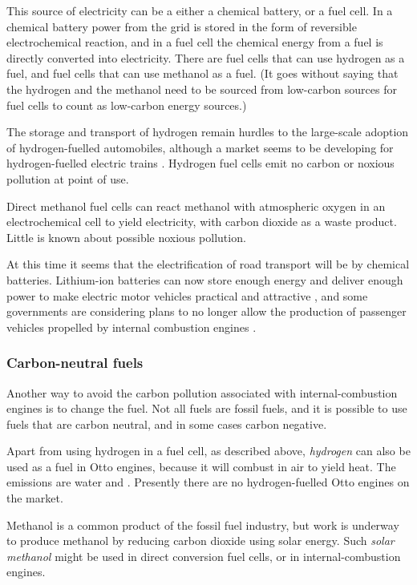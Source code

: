 This source of electricity can be a either a chemical battery, or a fuel cell.
In a chemical battery power from the grid is stored in the form of reversible
electrochemical reaction, and in a fuel cell the chemical energy from a fuel is
directly converted into electricity. There are fuel cells that can use hydrogen
as a fuel, and fuel cells that can use methanol as a fuel. (It goes without
saying that the hydrogen and the methanol need to be sourced from low-carbon
sources for fuel cells to count as low-carbon energy sources.)

The storage and transport of hydrogen remain hurdles to the large-scale adoption
of hydrogen-fuelled automobiles, although a market seems to be developing for
hydrogen-fuelled electric trains \autocite{theguardian_2018}. Hydrogen fuel cells
emit no carbon or noxious pollution at point of use.

Direct methanol fuel cells can react methanol with atmospheric oxygen in an
electrochemical cell to yield electricity, with carbon dioxide
as a waste product. Little is known about possible noxious pollution.

At this time it seems that the electrification of road transport will be by
chemical batteries. Lithium-ion batteries can now store enough energy and
deliver enough power to make electric motor vehicles practical and
attractive \autocite{Hayes2011}, and some governments are considering plans to no
longer allow the production of passenger vehicles propelled by internal
combustion engines \autocite{Burke-Kennedy2018} \autocite{Reuters2018}
\autocite{Gabbatiss2018}.

\subsubsection{Carbon-neutral fuels} 

Another way to avoid the carbon pollution associated with internal-combustion
engines is to change the fuel. Not all fuels are fossil fuels, and it is
possible to use fuels that are carbon neutral, and in some cases carbon
negative.

Apart from using hydrogen in a fuel cell, as described above, \textit{hydrogen}
can also be used as a fuel in Otto engines, because it will combust in air to
yield heat. The emissions are water and \nox. Presently there are no
hydrogen-fuelled Otto engines on the market.

Methanol is a common product of the fossil fuel industry, but work is underway
to produce methanol by reducing carbon dioxide using solar energy. Such
\textit{solar methanol} might be used in direct conversion fuel cells, or in
internal\hyp{}combustion engines.

